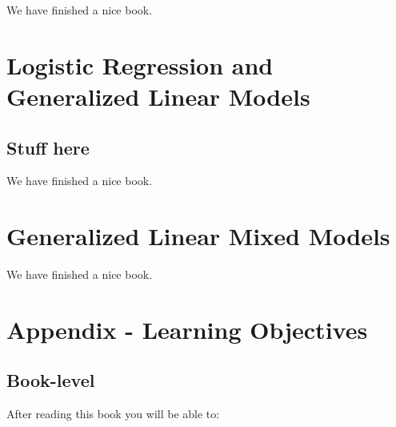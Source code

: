\documentclass[
]{book}
\theoremstyle{definition}
\theoremstyle{definition}
\theoremstyle{definition}
\theoremstyle{remark}
\begin{document}
We have finished a nice book.

\hypertarget{logistic}{%
\chapter{Logistic Regression and Generalized Linear Models}\label{logistic}}

\hypertarget{stuff-here}{%
\section{Stuff here}\label{stuff-here}}

We have finished a nice book.

\hypertarget{glmm}{%
\chapter{Generalized Linear Mixed Models}\label{glmm}}

We have finished a nice book.

\hypertarget{learningobj}{%
\chapter{Appendix - Learning Objectives}\label{learningobj}}

\hypertarget{book-level}{%
\section{Book-level}\label{book-level}}

After reading this book you will be able to:
\end{document}

